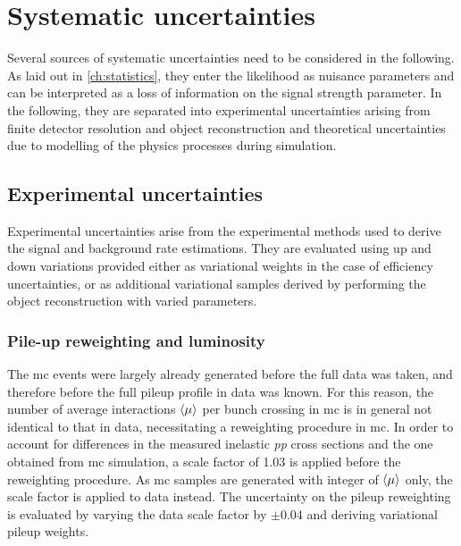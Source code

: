 

\chapter{Systematic uncertainties}\label{ch:uncertainties}

\ifpdf
    \graphicspath{{chapter-uncertainties/Figs/Raster/}{chapter-uncertainties/Figs/PDF/}{chapter-uncertainties/Figs/}}
\else
    \graphicspath{{chapter-uncertainties/Figs/Vector/}{chapter-uncertainties/Figs/}}
\fi

Several sources of systematic uncertainties need to be considered in the following. As laid out in \cref{ch:statistics}, they enter the likelihood as nuisance parameters and can be interpreted as a loss of information on the signal strength parameter. In the following, they are separated into experimental uncertainties arising from finite detector resolution and object reconstruction and theoretical uncertainties due to modelling of the physics processes during simulation. 

\section{Experimental uncertainties}

Experimental uncertainties arise from the experimental methods used to derive the signal and background rate estimations. They are evaluated using up and down variations provided either as variational weights in the case of efficiency uncertainties, or as additional variational samples derived by performing the object reconstruction with varied parameters.

\subsection{Pile-up reweighting and luminosity}

The \gls{mc} events were largely already generated before the full data was taken, and therefore before the full pileup profile in data was known. For this reason, the number of average interactions $\braket{\mu}$ per bunch crossing in \gls{mc} is in general not identical to that in data, necessitating a reweighting procedure in \gls{mc}. In order to account for differences in the measured inelastic \textit{pp} cross sections and the one obtained from \gls{mc} simulation, a scale factor of 1.03 is applied before the reweighting procedure. As \gls{mc} samples are generated with integer of $\braket{\mu}$ only, the scale factor is applied to data instead. The uncertainty on the pileup reweighting is evaluated by varying the data scale factor by $\pm 0.04$ and deriving variational pileup weights.

